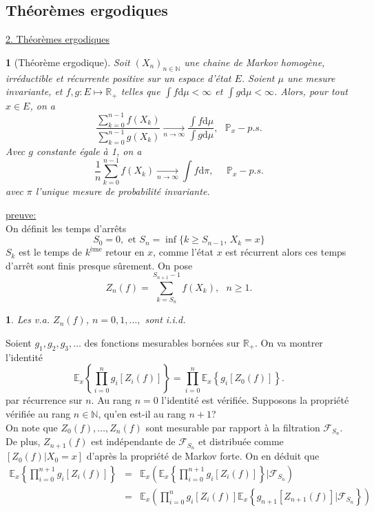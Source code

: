 \documentclass[8pt,notheorems]{beamer}
\def \E{\mathbb E}
\def \N{\mathbb N}
\def \P {\mathbb P}
\newtheorem{theorem}{\translate{Theorem}}[section]
\newtheorem{theorem}{\translate{Theoreme}}
\newtheorem{lemma}{\translate{Lemme}}
\theoremstyle{definition}
\theoremstyle{example}
\theoremstyle{mystyle}
\theoremstyle{plain}
\begin{document}
\subsection{Théorèmes ergodiques}
\begin{frame}[allowframebreaks]
\underline{2. Théorèmes ergodiques}\\
\begin{theorem}[Théorème ergodique]\label{theo:ergodique}
Soit $(X_n)_{n\in\N}$ une chaine de Markov homogène, irréductible et récurrente positive sur un espace d'état $E$. Soient $\mu$ une
mesure invariante, et  $f,g:E\mapsto \mathbb{R}_+$ telles que
$\int f\text{d}\mu<\infty$ et $\int g\text{d}\mu<\infty$. Alors, pour tout $x\in E$, on a
$$
\frac{\sum_{k = 0}^{n-1} f(X_k)}{\sum_{k = 0}^{n-1} g(X_k)}\underset{n\rightarrow \infty}{\rightarrow}\frac{\int f\text{d}\mu}{\int g\text{d}\mu},\text{ }\P_x-p.s.
$$
Avec $g$ constante égale à 1, on a
$$
\frac{1}{n}\sum_{k = 0}^{n-1} f(X_k)\underset{n\rightarrow \infty}{\rightarrow} \int f\text{d}\pi,\text{ }\text{ }\P_x-p.s.
$$
avec $\pi$ l'unique mesure de probabilité invariante.
\end{theorem}
\underline{preuve:}\\
On définit les temps d'arrêts
$$
S_0 = 0, \text{ et }S_n =\inf\{k\geq S_{n-1}\text{, }X_k = x\}
$$
$S_k$ est le temps de $k^{\text{ème}}$ retour en $x$, comme l'état $x$ est récurrent alors ces temps d'arrêt sont finis presque sûrement. On pose
$$
Z_n(f) = \sum_{k = S_n}^{S_{n+1}-1}f(X_k),\text{ }n\geq 1.
$$
\begin{lemma}
Les v.a. $Z_n(f)$, $n = 0,1,\ldots,$ sont i.i.d.
\end{lemma}
Soient $g_1,g_2,g_3,\ldots$ des fonctions mesurables bornées sur $\mathbb{R}_+$. On va montrer l'identité
$$
\E_x\left\{\prod_{i = 0}^{n}g_i[Z_i(f)]\right\}=\prod_{i = 0}^{n}\E_x\left\{g_i[Z_0(f)]\right\}.
$$
par récurrence sur $n$. Au rang $n = 0$ l'identité est vérifiée. Supposons la propriété vérifiée au rang $n\in \N$, qu'en est-il au rang $n+1$?\\
On note que $Z_{0}(f),\ldots, Z_n(f)$ sont mesurable par rapport à la filtration $\mathcal{F}_{S_n}$. De plus, $Z_{n+1}(f)$ est indépendante de $\mathcal{F}_{S_n}$ et distribuée comme $[Z_0(f)|X_0 = x]$ d'après la propriété de Markov forte. On en déduit que
\begin{eqnarray*}
\E_x\left\{\prod_{i = 0}^{n+1}g_i[Z_i(f)]\right\}&=&\E_x\left(\E_x\left\{\prod_{i = 0}^{n+1}g_i[Z_i(f)]\right\}\Big\rvert\mathcal{F}_{S_n}\right)\\
&=&\E_x\left(\prod_{i = 0}^{n}g_i[Z_i(f)]\E_x\left\{g_{n+1}[Z_{n+1}(f)]\Big\rvert\mathcal{F}_{S_n}\right\}\right)\\

\end{eqnarray*}
\end{frame}
\end{document}
